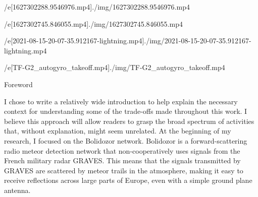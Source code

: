 

\def\mycite[#1]{{\null\def\_addcitelist##1{}\nonumcitations\unskip\cite[#1]}}
\def\specialbibs{\bibnum=1000
   \def\_printbib{\hangindent=2\iindent
      \noindent\hskip2\iindent \llap{[\the\bibmark] }}%
}


\def\printcaption#1#2{\leftskip=\iindent \rightskip=\iindent 
   \setbox0=\hbox\bgroup \aftergroup\docaption{\bf#1 #2.}\enspace} 
\def\docaption{\tmpdim=\hsize \advance\tmpdim by-2\iindent 
   \ifdim\wd0>\tmpdim \unhbox0 \else \hfil\hfil\unhbox0 \fi \endgraf \egroup} 




\filedef/e[1627302288.9546976.mp4]{./img/1627302288.9546976.mp4}
\attach[1627302288.9546976.mp4]

\filedef/e[1627302745.846055.mp4]{./img/1627302745.846055.mp4}
\attach[1627302745.846055.mp4]

\filedef/e[2021-08-15-20-07-35.912167-lightning.mp4]{./img/2021-08-15-20-07-35.912167-lightning.mp4}
\attach[2021-08-15-20-07-35.912167-lightning.mp4]

\filedef/e[TF-G2_autogyro_takeoff.mp4]{./img/TF-G2_autogyro_takeoff.mp4}



\showattached

\draft


\makefront

\sec \notoc \nonum Foreword 

I chose to write a relatively wide introduction to help explain the necessary context for understanding some of the trade-offs made throughout this work. I believe this approach will allow readers to grasp the broad spectrum of activities that, without explanation, might seem unrelated.
At the beginning of my research, I focused on the Bolidozor network. Bolidozor is a forward-scattering radio meteor detection network that non-cooperatively uses signals from the French military radar GRAVES.  This means that the signals transmitted by GRAVES are scattered by meteor trails in the atmosphere, making it easy to receive reflections across large parts of Europe, even with a simple ground plane antenna.
  
